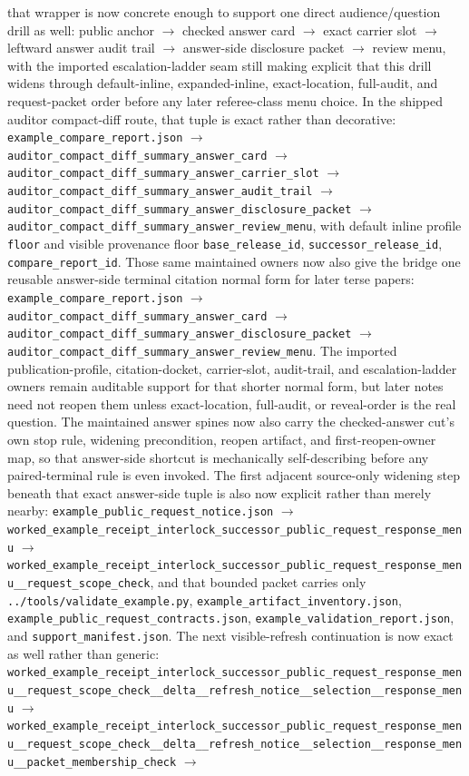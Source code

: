 \documentclass[11pt]{article}
\begin{document}
that wrapper is now concrete enough to support one direct audience/question drill as well: public anchor $\to$ checked answer card $\to$ exact carrier slot $\to$ leftward answer audit trail $\to$ answer-side disclosure packet $\to$ review menu, with the imported escalation-ladder seam still making explicit that this drill widens through default-inline, expanded-inline, exact-location, full-audit, and request-packet order before any later referee-class menu choice. In the shipped auditor compact-diff route, that tuple is exact rather than decorative: \nolinkurl{example_compare_report.json} $\to$ \texttt{auditor\_compact\_diff\_summary\_answer\_card} $\to$ \texttt{auditor\_compact\_diff\_summary\_answer\_carrier\_slot} $\to$ \texttt{auditor\_compact\_diff\_summary\_answer\_audit\_trail} $\to$ \texttt{auditor\_compact\_diff\_summary\_answer\_disclosure\_packet} $\to$ \texttt{auditor\_compact\_diff\_summary\_answer\_review\_menu}, with default inline profile \texttt{floor} and visible provenance floor \texttt{base\_release\_id}, \texttt{successor\_release\_id}, \texttt{compare\_report\_id}. Those same maintained owners now also give the bridge one reusable answer-side terminal citation normal form for later terse papers: \nolinkurl{example_compare_report.json} $\to$ \texttt{auditor\_compact\_diff\_summary\_answer\_card} $\to$ \texttt{auditor\_compact\_diff\_summary\_answer\_disclosure\_packet} $\to$ \texttt{auditor\_compact\_diff\_summary\_answer\_review\_menu}. The imported publication-profile, citation-docket, carrier-slot, audit-trail, and escalation-ladder owners remain auditable support for that shorter normal form, but later notes need not reopen them unless exact-location, full-audit, or reveal-order is the real question. The maintained answer spines now also carry the checked-answer cut's own stop rule, widening precondition, reopen artifact, and first-reopen-owner map, so that answer-side shortcut is mechanically self-describing before any paired-terminal rule is even invoked. The first adjacent source-only widening step beneath that exact answer-side tuple is also now explicit rather than merely nearby: \nolinkurl{example_public_request_notice.json} $\to$ \texttt{worked\_example\_receipt\_interlock\_successor\_public\_request\_response\_menu} $\to$ \texttt{worked\_example\_receipt\_interlock\_successor\_public\_request\_response\_menu\_\_request\_scope\_check}, and that bounded packet carries only \nolinkurl{../tools/validate_example.py}, \nolinkurl{example_artifact_inventory.json}, \nolinkurl{example_public_request_contracts.json}, \nolinkurl{example_validation_report.json}, and \nolinkurl{support_manifest.json}. The next visible-refresh continuation is now exact as well rather than generic: \texttt{worked\_example\_receipt\_interlock\_successor\_public\_request\_response\_menu\_\_request\_scope\_check\_\_delta\_\_refresh\_notice\_\_selection\_\_response\_menu} $\to$ \texttt{worked\_example\_receipt\_interlock\_successor\_public\_request\_response\_menu\_\_request\_scope\_check\_\_delta\_\_refresh\_notice\_\_selection\_\_response\_menu\_\_packet\_membership\_check} $\to$ 
\end{document}
